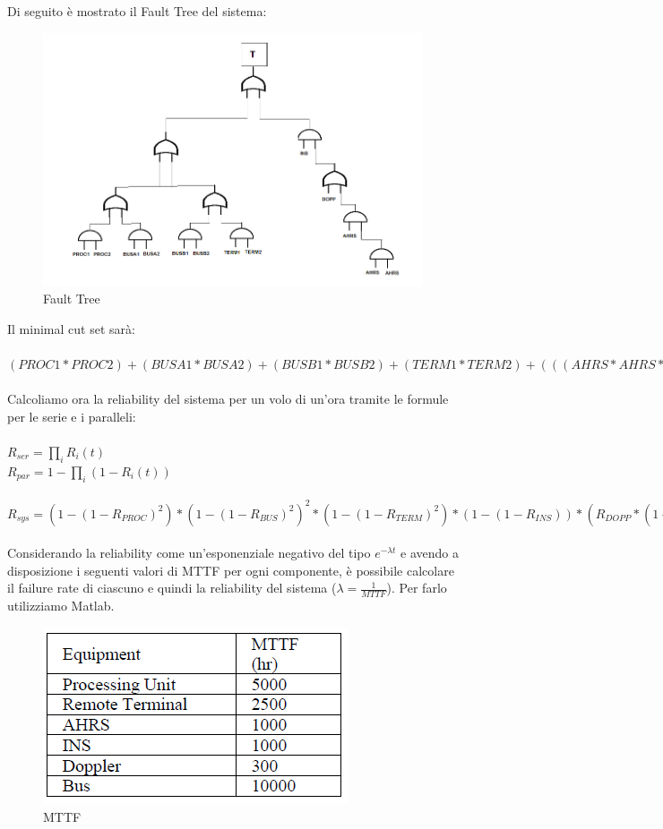 	Di seguito è mostrato il Fault Tree del sistema:
	
	\begin{figure}[H]
		\centering
		\includegraphics[scale=0.7]{./immagine/fault_tree_es5.png}
		\caption{Fault Tree}
		\label{fig:fault_tree_es5}
	\end{figure}
	
	Il minimal cut set sarà:\\\\
	$ (PROC1*PROC2)+(BUSA1*BUSA2)+(BUSB1*BUSB2)+(TERM1*TERM2)+(((AHRS*AHRS*AHRS)+DOPP)*INS) $\\\\
	Calcoliamo ora la reliability del sistema per un volo di un'ora tramite le formule per le serie e i paralleli:\\\\
	$ R_{ser}=\prod_{i}^{}R_{i}(t) $\\
	$ R_{par}=1-\prod_{i}^{}(1-R_{i}(t)) $\\\\
	$ R_{sys}=(1-(1-R_{PROC})^{2})*(1-(1-R_{BUS})^{2})^{2}*(1-(1-R_{TERM})^{2})*(1-(1-R_{INS}))*(R_{DOPP}*(1-(1-R_{AHRS})^{3})) $\\\\
	
	Considerando la reliability come un'esponenziale negativo del tipo $ e^{-\lambda t} $ e avendo a disposizione i seguenti valori di MTTF per ogni componente, è possibile calcolare il failure rate di ciascuno e quindi la reliability del sistema ($\lambda=\frac{1}{MTTF}$). Per farlo utilizziamo Matlab.
	
		\begin{figure}[H]
			\centering
			\includegraphics[scale=0.7]{./immagine/mttf_es5.png}
			\caption{MTTF}
			\label{fig:mttf_es5}
		\end{figure}
		
